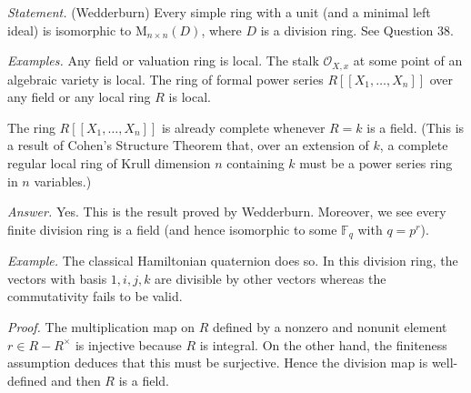 \documentclass{mathproblems}
\newcommand\OO{\mathcal{O}}
\newcommand\F{\mathbb{F}}
\begin{document}
\begin{questions}


\textit{Statement.} (Wedderburn) Every simple ring with a unit (and a minimal left ideal) is isomorphic to $\mathrm{M}_{n\times n}(D)$, where $D$ is a division ring. See Question 38.


\textit{Examples.} Any field or valuation ring is local. The stalk $\OO_{X,x}$ at some point of an algebraic variety is local. The ring of formal power series $R[\![X_1,\ldots,X_n]\!]$ over any field or any local ring $R$ is local. 

The ring $R[\![X_1,\ldots,X_n]\!]$ is already complete whenever $R=k$ is a field. (This is a result of Cohen's Structure Theorem that, over an extension of $k$, a complete regular local ring of Krull dimension $n$ containing $k$ must be a power series ring in $n$ variables.)





\textit{Answer.} Yes. This is the result proved by Wedderburn. Moreover, we see every finite division ring is a field (and hence isomorphic to some $\F_q$ with $q=p^r$).

\textit{Example.} The classical Hamiltonian quaternion does so. In this division ring, the vectors with basis ${1,i,j,k}$ are divisible by other vectors whereas the commutativity fails to be valid. 



\textit{Proof.} The multiplication map on $R$ defined by a nonzero and nonunit element $r\in R-R^\times$ is injective because $R$ is integral. On the other hand, the finiteness assumption deduces that this must be surjective. Hence the division map is well-defined and then $R$ is a field.


\end{questions}
\end{document}
